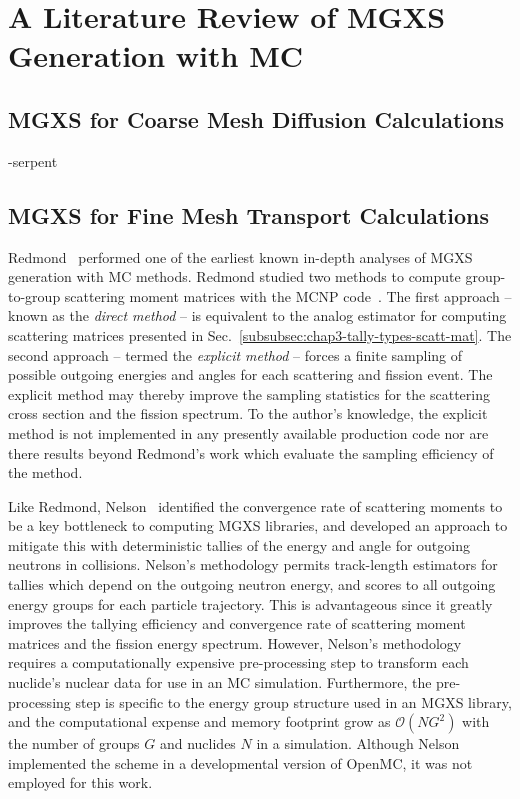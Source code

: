 \section{A Literature Review of MGXS Generation with MC}
\label{sec:chap3-lit-review}

\subsection{MGXS for Coarse Mesh Diffusion Calculations}
\label{sec:chap3-lit-review-diffusion}

-serpent\\


\subsection{MGXS for Fine Mesh Transport Calculations}
\label{sec:chap3-lit-review-diffusion}

Redmond~\cite{redmond1997multigroup} performed one of the earliest known in-depth analyses of \ac{MGXS} generation with \ac{MC} methods. Redmond studied two methods to compute group-to-group scattering moment matrices with the MCNP code~\cite{mcnpx2003manual}. The first approach -- known as the \textit{direct method} -- is equivalent to the analog estimator for computing scattering matrices presented in Sec.~\ref{subsubsec:chap3-tally-types-scatt-mat}. The second approach -- termed the \textit{explicit method} -- forces a finite sampling of possible outgoing energies and angles for each scattering and fission event. The explicit method may thereby improve the sampling statistics for the scattering cross section and the fission spectrum. To the author's knowledge, the explicit method is not implemented in any presently available production code nor are there results beyond Redmond's work which evaluate the sampling efficiency of the method.


Like Redmond, Nelson~\cite{nelson2014improved} identified the convergence rate of scattering moments to be a key bottleneck to computing \ac{MGXS} libraries, and developed an approach to mitigate this with deterministic tallies of the energy and angle for outgoing neutrons in collisions. Nelson's methodology permits track-length estimators for tallies which depend on the outgoing neutron energy, and scores to all outgoing energy groups for each particle trajectory. This is advantageous since it greatly improves the tallying efficiency and convergence rate of scattering moment matrices and the fission energy spectrum. However, Nelson's methodology requires a computationally expensive pre-processing step to transform each nuclide's nuclear data for use in an \ac{MC} simulation. Furthermore, the pre-processing step is specific to the energy group structure used in an \ac{MGXS} library, and the computational expense and memory footprint grow as $\mathcal{O}(NG^{2})$ with the number of groups $G$ and nuclides $N$ in a simulation. Although Nelson implemented the scheme in a developmental version of OpenMC, it was not employed for this work.

